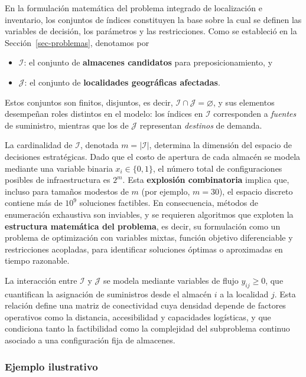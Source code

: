 \documentclass[
  spanish,
  us-letterpaper,
]{scrreprt}
\providecommand{\tightlist}{%
  \setlength{\itemsep}{0pt}\setlength{\parskip}{0pt}}
\numberwithin{equation}{section}
\begin{document}
En la formulación matemática del problema integrado de localización e
inventario, los conjuntos de índices constituyen la base sobre la cual
se definen las variables de decisión, los parámetros y las
restricciones. Como se estableció en la Sección~\ref{sec-problemas},
denotamos por

\begin{itemize}
\tightlist
\item
  \(\mathcal{I}\): el conjunto de \textbf{almacenes candidatos} para
  preposicionamiento, y\\
\item
  \(\mathcal{J}\): el conjunto de \textbf{localidades geográficas
  afectadas}.
\end{itemize}

Estos conjuntos son finitos, disjuntos, es decir,
\(\mathcal{I} \cap \mathcal{J} = \varnothing\), y sus elementos
desempeñan roles distintos en el modelo: los índices en \(\mathcal{I}\)
corresponden a \emph{fuentes} de suministro, mientras que los de
\(\mathcal{J}\) representan \emph{destinos} de demanda.

La cardinalidad de \(\mathcal{I}\), denotada \(m = |\mathcal{I}|\),
determina la dimensión del espacio de decisiones estratégicas. Dado que
el costo de apertura de cada almacén se modela mediante una variable
binaria \(x_i \in \{0,1\}\), el número total de configuraciones posibles
de infraestructura es \(2^m\). Esta \textbf{explosión combinatoria}
implica que, incluso para tamaños modestos de \(m\) (por ejemplo,
\(m = 30\)), el espacio discreto contiene más de \(10^9\) soluciones
factibles. En consecuencia, métodos de enumeración exhaustiva son
inviables, y se requieren algoritmos que exploten la \textbf{estructura
matemática del problema}, es decir, su formulación como un problema de
optimización con variables mixtas, función objetivo diferenciable y
restricciones acopladas, para identificar soluciones óptimas o
aproximadas en tiempo razonable.

La interacción entre \(\mathcal{I}\) y \(\mathcal{J}\) se modela
mediante variables de flujo \(y_{ij} \geq 0\), que cuantifican la
asignación de suministros desde el almacén \(i\) a la localidad \(j\).
Esta relación define una matriz de conectividad cuya densidad depende de
factores operativos como la distancia, accesibilidad y capacidades
logísticas, y que condiciona tanto la factibilidad como la complejidad
del subproblema continuo asociado a una configuración fija de almacenes.

\subsubsection{\texorpdfstring{\textbf{Ejemplo
ilustrativo}}{Ejemplo ilustrativo}}\label{ejemplo-ilustrativo}
\end{document}
